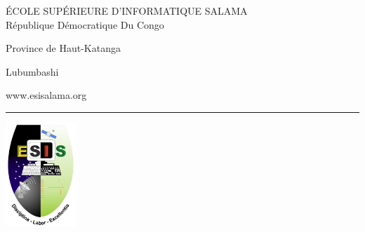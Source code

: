 \documentclass[a4paper,12pt]{report}
\begin{document}

    \begin{titlepage}
        \begin{center}
            {\Large ÉCOLE SUPÉRIEURE D’INFORMATIQUE SALAMA}\\
            {\large République Démocratique Du Congo}
            
            {\large Province de Haut-Katanga}
            
            {\large Lubumbashi}
            
            {\large www.esisalama.org}
            \vspace{10pt}
            
            \rule[30pt]{300pt}{1pt}
        \end{center}
        \begin{center}
            \includegraphics[width=100]{images/logo.png}
        \end{center}
        

\end{titlepage}
\end{document}
